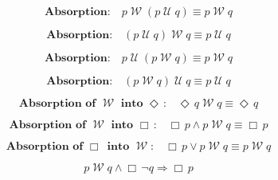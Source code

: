 \documentclass[12pt, fleqn, leqno]{article}
\newcommand{\impl}{\ensuremath{\Rightarrow}}        %
\newcommand{\Until}{\;\mathcal{U}\;}
\newcommand{\Wait}{\;\mathcal{W}\;}
\newcommand{\Event}{\Diamond\,}
\newcommand{\Always}{\Box\,}
\newcommand{\spacer}{\vspace{-30pt}}
\begin{document}
\spacer


\begin{equation}\label{E:leftWaitAbsUtil}
\textbf{Absorption:}\quad p \Wait (p \Until q) \equiv p \Wait q
\end{equation}

\spacer

\begin{equation}\label{E:rightWaitAbsUtil}
\textbf{Absorption:}\quad (p \Until q) \Wait q \equiv p \Until q
\end{equation}

\spacer

\begin{equation}\label{E:leftUntilAbsWait}
\textbf{Absorption:}\quad p \Until (p \Wait q) \equiv p \Wait q
\end{equation}

\spacer

\begin{equation}\label{E:rightUntilAbsWait}
\textbf{Absorption:}\quad (p \Wait q) \Until q \equiv p \Until q
\end{equation}

\spacer

\begin{equation}\label{E:absorpEventWait}
\textbf{Absorption of $\Wait$ into $\Event$:}\quad \Event q \Wait q \equiv \Event q
\end{equation}

\spacer

\begin{equation}\label{E:absWaitAlways}
\textbf{Absorption of $\Wait$ into $\Always$:}\quad \Always p\land p\Wait q\equiv \Always p
\end{equation}

\spacer

\begin{equation}\label{E:absAlwaysWait}
\textbf{Absorption of $\Always$ into $\Wait$:}\quad \Always p\lor p\Wait q\equiv p\Wait q
\end{equation}

\spacer

\begin{equation}\label{E:waitEntailAlways}
p \Wait q \land \Always\neg q \impl \Always p
\end{equation}
\end{document}

